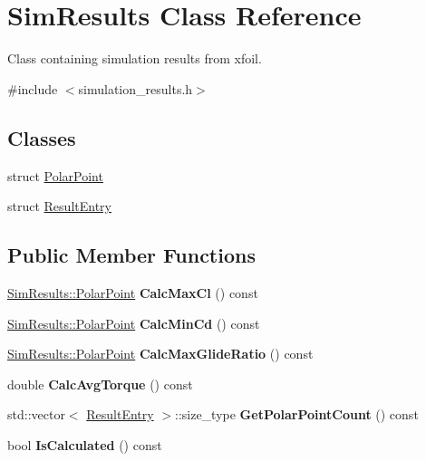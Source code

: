 \hypertarget{class_sim_results}{}\section{Sim\+Results Class Reference}
\label{class_sim_results}


Class containing simulation results from xfoil.  




{\ttfamily \#include $<$simulation\+\_\+results.\+h$>$}

\subsection*{Classes}
\begin{DoxyCompactItemize}
\item 
struct \hyperlink{struct_sim_results_1_1_polar_point}{Polar\+Point}
\item 
struct \hyperlink{struct_sim_results_1_1_result_entry}{Result\+Entry}
\end{DoxyCompactItemize}
\subsection*{Public Member Functions}
\begin{DoxyCompactItemize}
\item 
\hypertarget{class_sim_results_a142ac7f12e1ba9e8980bcc58072f38bf}{}\label{class_sim_results_a142ac7f12e1ba9e8980bcc58072f38bf} 
\hyperlink{struct_sim_results_1_1_polar_point}{Sim\+Results\+::\+Polar\+Point} {\bfseries Calc\+Max\+Cl} () const
\item 
\hypertarget{class_sim_results_ad7296411c1465f6c88996c24d492099d}{}\label{class_sim_results_ad7296411c1465f6c88996c24d492099d} 
\hyperlink{struct_sim_results_1_1_polar_point}{Sim\+Results\+::\+Polar\+Point} {\bfseries Calc\+Min\+Cd} () const
\item 
\hypertarget{class_sim_results_ae3e5c526d3fd0a98a3fd532485a0a849}{}\label{class_sim_results_ae3e5c526d3fd0a98a3fd532485a0a849} 
\hyperlink{struct_sim_results_1_1_polar_point}{Sim\+Results\+::\+Polar\+Point} {\bfseries Calc\+Max\+Glide\+Ratio} () const
\item 
\hypertarget{class_sim_results_a1937f20a3e1e61089d72153f594b62ae}{}\label{class_sim_results_a1937f20a3e1e61089d72153f594b62ae} 
double {\bfseries Calc\+Avg\+Torque} () const
\item 
\hypertarget{class_sim_results_a7ddcffa0f2a611b8cf0944e583bacaf4}{}\label{class_sim_results_a7ddcffa0f2a611b8cf0944e583bacaf4} 
std\+::vector$<$ \hyperlink{struct_sim_results_1_1_result_entry}{Result\+Entry} $>$\+::size\+\_\+type {\bfseries Get\+Polar\+Point\+Count} () const
\item 
\hypertarget{class_sim_results_a6614bf944d25e327b28c1574f2123f15}{}\label{class_sim_results_a6614bf944d25e327b28c1574f2123f15} 
bool {\bfseries Is\+Calculated} () const
\end{DoxyCompactItemize}
